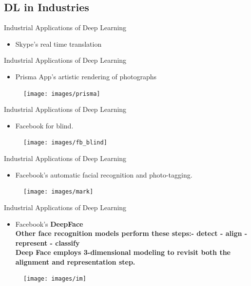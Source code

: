 \documentclass[10pt]{beamer}
\begin{document}
	\subsection{DL in Industries}
	\begin{frame}[t]{Industrial Applications of Deep Learning}
		\begin{itemize}
			\item \large{Skype's real time translation}
		\end{itemize}
	\end{frame}
	\begin{frame}[t]{Industrial Applications of Deep Learning}
		\begin{itemize}
			\item \large{Prisma App's artistic rendering of photographs}
		\end{itemize}
		\begin{figure}
			\texttt{[image: images/prisma]}
		\end{figure}
	\end{frame}
	\begin{frame}[t]{Industrial Applications of Deep Learning}
		\begin{itemize}
			\item \large{Facebook for blind.}
		\end{itemize}
		\begin{figure}
			\texttt{[image: images/fb\_blind]}
		\end{figure}
	\end{frame}
	\begin{frame}[t]{Industrial Applications of Deep Learning}
		\begin{itemize}
			\item \large{Facebook's automatic facial recognition and photo-tagging.}
		\end{itemize}
		\begin{figure}
			\texttt{[image: images/mark]}
		\end{figure}
	\end{frame}
	\begin{frame}[t]{Industrial Applications of Deep Learning}
		\begin{itemize}
			\item \large{Facebook's \textbf{DeepFace}}
			\\
			\bigskip
			\textbf{Other face recognition models perform these steps:- detect - align - represent - classify
			\\
			\bigskip	
			Deep Face employs 3-dimensional modeling to revisit both the alignment and representation step.
			}
		\end{itemize}
		\pause
		\begin{figure}
			\texttt{[image: images/im]}
		\end{figure}
	\end{frame}
\end{document}
